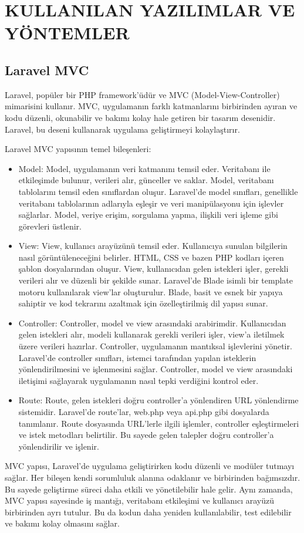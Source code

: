 \section{KULLANILAN YAZILIMLAR VE YÖNTEMLER}

\subsection{Laravel MVC}

Laravel, popüler bir PHP framework'üdür ve MVC (Model-View-Controller) mimarisini kullanır. MVC, uygulamanın farklı katmanlarını birbirinden ayıran ve kodu düzenli, okunabilir ve bakımı kolay hale getiren bir tasarım desenidir. Laravel, bu deseni kullanarak uygulama geliştirmeyi kolaylaştırır.

 Laravel MVC yapısının temel bileşenleri:
\begin{itemize}
\item Model:
Model, uygulamanın veri katmanını temsil eder. Veritabanı ile etkileşimde bulunur, verileri alır, günceller ve saklar. Model, veritabanı tablolarını temsil eden sınıflardan oluşur. Laravel'de model sınıfları, genellikle veritabanı tablolarının adlarıyla eşleşir ve veri manipülasyonu için işlevler sağlarlar. Model, veriye erişim, sorgulama yapma, ilişkili veri işleme gibi görevleri üstlenir.

\item View:
View, kullanıcı arayüzünü temsil eder. Kullanıcıya sunulan bilgilerin nasıl görüntüleneceğini belirler. HTML, CSS ve bazen PHP kodları içeren şablon dosyalarından oluşur. View, kullanıcıdan gelen istekleri işler, gerekli verileri alır ve düzenli bir şekilde sunar. Laravel'de Blade isimli bir template motoru kullanılarak view'lar oluşturulur. Blade, basit ve esnek bir yapıya sahiptir ve kod tekrarını azaltmak için özelleştirilmiş dil yapısı sunar.

\item Controller:
Controller, model ve view arasındaki arabirimdir. Kullanıcıdan gelen istekleri alır, modeli kullanarak gerekli verileri işler, view'a iletilmek üzere verileri hazırlar. Controller, uygulamanın mantıksal işlevlerini yönetir. Laravel'de controller sınıfları, istemci tarafından yapılan isteklerin yönlendirilmesini ve işlenmesini sağlar. Controller, model ve view arasındaki iletişimi sağlayarak uygulamanın nasıl tepki verdiğini kontrol eder.

\item Route:
Route, gelen istekleri doğru controller'a yönlendiren URL yönlendirme sistemidir. Laravel'de route'lar, web.php veya api.php gibi dosyalarda tanımlanır. Route dosyasında URL'lerle ilgili işlemler, controller eşleştirmeleri ve istek metodları belirtilir. Bu sayede gelen talepler doğru controller'a yönlendirilir ve işlenir.
\end{itemize}
MVC yapısı, Laravel'de uygulama geliştirirken kodu düzenli ve modüler tutmayı sağlar. Her bileşen kendi sorumluluk alanına odaklanır ve birbirinden bağımsızdır. Bu sayede geliştirme süreci daha etkili ve yönetilebilir hale gelir.
Aynı  zamanda, MVC yapısı sayesinde iş mantığı, veritabanı etkileşimi ve kullanıcı arayüzü birbirinden ayrı tutulur. Bu da kodun daha yeniden kullanılabilir, test edilebilir ve bakımı kolay olmasını sağlar.


